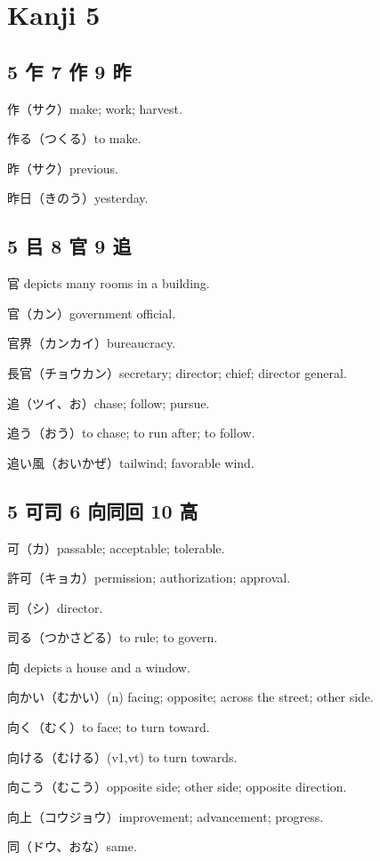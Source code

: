 \chapter{Kanji 5}

\section{5 乍 7 作 9 昨}

作（サク）make; work; harvest.

作る（つくる）to make.

昨（サク）previous.

昨日（きのう）yesterday.

\section{5 㠯 8 官 9 追}

官 depicts many rooms in a building.

官（カン）government official.

官界（カンカイ）bureaucracy.

長官（チョウカン）secretary; director; chief; director general.

追（ツイ、お）chase; follow; pursue.

追う（おう）to chase; to run after; to follow.

追い風（おいかぜ）tailwind; favorable wind.

\section{5 可司 6 向同回 10 高}

可（カ）passable; acceptable; tolerable.

許可（キョカ）permission; authorization; approval.

司（シ）director.

司る（つかさどる）to rule; to govern.

向 depicts a house and a window.

向かい（むかい）(n) facing; opposite; across the street; other side.

向く（むく）to face; to turn toward.

向ける（むける）(v1,vt) to turn towards.

向こう（むこう）opposite side; other side; opposite direction.

向上（コウジョウ）improvement; advancement; progress.

同（ドウ、おな）same.

